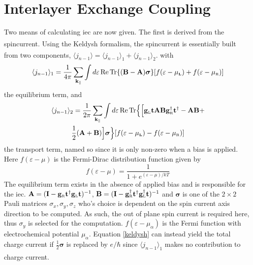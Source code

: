 \documentclass[a4paper, 12pt]{article}
\begin{document}
	\section{Interlayer Exchange Coupling}
	Two means of calculating \gls{iec} are now given. The first is derived from the spincurrent.
	Using the Keldysh formalism\textsuperscript{\textcolor{blue}{\cite{keldyshorig}}}, the spincurrent is essentially built from two components, $\langle j_{n-1}\rangle = \langle j_{n-1}\rangle_1 + \langle j_{n-1}\rangle_2$\textcolor{blue}{\textsuperscript{\cite{keldysh_3}}}.
with 
\begin{equation}\label{keldysh_1}
	\langle j_{n-1}\rangle_1 = \frac{1}{4\pi}\sum_{\bf k_\parallel}\int d\varepsilon \,\rm Re \, Tr \lbrace\bf (B-A)\bm\sigma\rbrace [\mathnormal f(\varepsilon - \mu_{\scriptscriptstyle L})+\mathnormal f(\varepsilon - \mu_{\rm\scriptscriptstyle R})]
\end{equation}
the equilibrium term, and
\begin{multline}\label{keldysh}
	\langle j_{n-1}\rangle_2 = \frac{1}{2\pi}\sum_{\bf k_\parallel}\int d\varepsilon \,\rm Re \, Tr \Big\lbrace\Big\lbrack\bf g_{\rm\scriptscriptstyle L} t A B g_{\rm \scriptscriptstyle R}^\dag t^\dag-AB+\\{\rm\frac{1}{2}} \bf(A+B)\Big\rbrack\bm\sigma\Big\rbrace [\mathnormal f(\varepsilon - \mu_{\scriptscriptstyle L})-\mathnormal f(\varepsilon - \mu_{\rm\scriptscriptstyle R})]
\end{multline}
the transport term, named so since it is only non-zero when a bias is applied. Here $f(\varepsilon-\mu)$ is the Fermi-Dirac distribution function given by
\begin{equation}\label{fermi}
	f(\varepsilon-\mu)=\frac{1}{1+e^{(\varepsilon-\mu)/kT}}
\end{equation}
The equilibrium term exists in the absence of applied bias and is responsible for the \gls{iec}.
$\bf A = (I - g_{\rm\scriptscriptstyle R}t^\dag g_{\rm\scriptscriptstyle L}t)^{\rm-1}$, $\bf B = (I -g_{\rm\scriptscriptstyle R}^\dag t^\dag g_{\rm\scriptscriptstyle L}^\dag t)^{\rm -1}$ and $\bm \sigma$ is one of the $2\times 2$ Pauli matrices $\sigma_x, \sigma_y, \sigma_z$ who's choice is dependent on the spin current axis direction to be computed. As such, the out of plane spin current is required here, thus $\sigma_y$ is selected for the computation. $f(\varepsilon - \mu_\alpha)$ is the Fermi function with electrochemical potential $\mu_\alpha$. Equation \eqref{keldysh} can instead yield the total charge current if $\frac{1}{2}\bm\sigma$ is replaced by $e/\hbar $ since $\langle j_{n-1}\rangle_1$ makes no contribution to charge current\textcolor{blue}{\textsuperscript{\cite{keldysh_2}}}.
\end{document}
